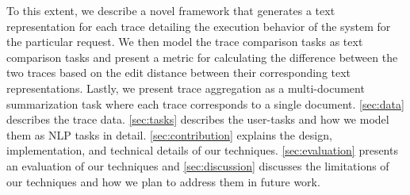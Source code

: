 To this extent, we describe a novel framework that generates a text representation
for each trace detailing the execution behavior of the system for the particular request. We then
model the trace comparison tasks as text comparison tasks and present a metric for calculating
the difference between the two traces based on the edit distance between their corresponding text representations.
Lastly, we present trace aggregation as a multi-document summarization task where each trace corresponds
to a single document. \autoref{sec:data} describes the trace data. \autoref{sec:tasks} describes
the user-tasks and how we model them as NLP tasks in detail. \autoref{sec:contribution} explains
the design, implementation, and technical details of our techniques. \autoref{sec:evaluation} presents
an evaluation of our techniques and \autoref{sec:discussion} discusses the limitations of our techniques
and how we plan to address them in future work.

